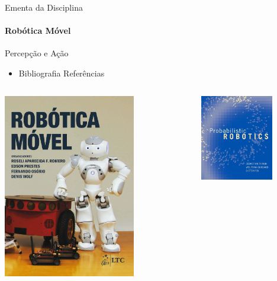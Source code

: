 \documentclass{beamer}
\begin{document}
\begin{frame}[t]{Ementa da Disciplina}
	\framesubtitle{Robótica Móvel}
	\begin{block}{Percepção e Ação}
	\end{block}
	\begin{itemize}
		\item Bibliografia Referências
	\end{itemize}
	\begin{columns}[c]
		\begin{column}{0.5\textwidth}
			\center
			\includegraphics[width=0.7\textwidth]{./images/livro9}
		\end{column}
		\begin{column}{0.5\textwidth}
			\center
			\includegraphics[width=0.7\textwidth]{./images/livro2}
		\end{column}
	\end{columns}
\end{frame}
\end{document}
